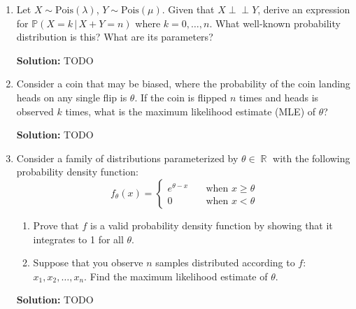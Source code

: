 \documentclass{article}
\DeclareMathOperator{\R}{\mathbb{R}}
\newenvironment{solution}{\color{blue} \smallskip \textbf{Solution:}}{}
\begin{document}
\begin{enumerate}
    Consider a random variable $X$, the distance of the strike from the center (in feet), and let the probability density function of $X$ be
    \[
        f(x) = \begin{cases} \frac{2}{\pi (1+x^2)} & x>0 \\ 0 & \text{otherwise} \end{cases}
    \]
    What is the expected value of the score of a single strike?

    \begin{solution}
        TODO
    \end{solution}

    \item
    Let $X\sim \text{Pois}(\lambda)$, $Y\sim \text{Pois}(\mu)$. 
    Given that $X \perp \!\!\! \perp Y$, derive an expression for ${\mathbb{P}(X = k \,|\, X+Y=n)}$ where $k = 0, \dots, n$. 
    What well-known probability distribution is this? What are its parameters?

    \begin{solution}
        TODO
    \end{solution}

    \item
    Consider a coin that may be biased, where the probability of the coin landing heads on any single flip is $\theta$. 
    If the coin is flipped $n$ times and heads is observed $k$ times, what is the maximum likelihood estimate (MLE) of $\theta$?

    \begin{solution}
        TODO
    \end{solution}

    \item 
    Consider a family of distributions parameterized by $\theta \in \R$ with the following probability density function:
    \[
        f_{\theta}(x) = \begin{cases}
            e^{\theta - x} \quad &\text{when } x \geq \theta \\
            0 \quad &\text{when } x < \theta
        \end{cases}
    \]
    \begin{enumerate}
        \item Prove that $f$ is a valid probability density function by showing that it integrates to 1 for all $\theta$.
        \item Suppose that you observe $n$ samples distributed according to $f$: $x_{1}, x_{2}, \ldots, x_{n}$. Find the maximum likelihood estimate of $\theta$.
    \end{enumerate}

    \begin{solution}
        TODO
    \end{solution}

\end{enumerate}
\end{document}
